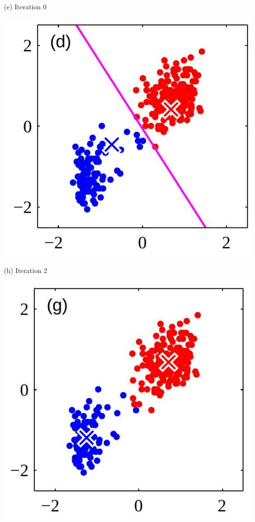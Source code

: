 \documentclass[10pt]{article}
\begin{document}
(e) Iteration 0

\begin{center}
\includegraphics[max width=\textwidth]{2023_12_30_43b7e6c218cb987b5fcag-6(6)}
\end{center}

(h) Iteration 2

\begin{center}
\includegraphics[max width=\textwidth]{2023_12_30_43b7e6c218cb987b5fcag-6(4)}
\end{center}
\end{document}
